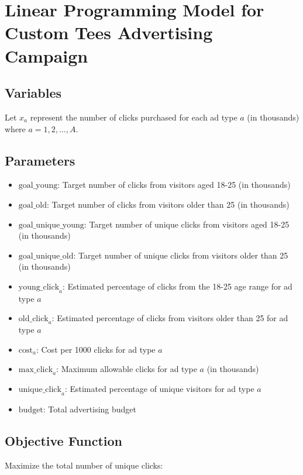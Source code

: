 \documentclass{article}
\begin{document}
\section*{Linear Programming Model for Custom Tees Advertising Campaign}

\subsection*{Variables}
Let \( x_a \) represent the number of clicks purchased for each ad type \( a \) (in thousands) where \( a = 1, 2, \ldots, A \). 

\subsection*{Parameters}
\begin{itemize}
    \item \( \text{goal\_young} \): Target number of clicks from visitors aged 18-25 (in thousands)
    \item \( \text{goal\_old} \): Target number of clicks from visitors older than 25 (in thousands)
    \item \( \text{goal\_unique\_young} \): Target number of unique clicks from visitors aged 18-25 (in thousands)
    \item \( \text{goal\_unique\_old} \): Target number of unique clicks from visitors older than 25 (in thousands)
    \item \( \text{young\_click}_a \): Estimated percentage of clicks from the 18-25 age range for ad type \( a \)
    \item \( \text{old\_click}_a \): Estimated percentage of clicks from visitors older than 25 for ad type \( a \)
    \item \( \text{cost}_a \): Cost per 1000 clicks for ad type \( a \)
    \item \( \text{max\_click}_a \): Maximum allowable clicks for ad type \( a \) (in thousands)
    \item \( \text{unique\_click}_a \): Estimated percentage of unique visitors for ad type \( a \)
    \item \( \text{budget} \): Total advertising budget
\end{itemize}

\subsection*{Objective Function}
Maximize the total number of unique clicks:
\end{document}
